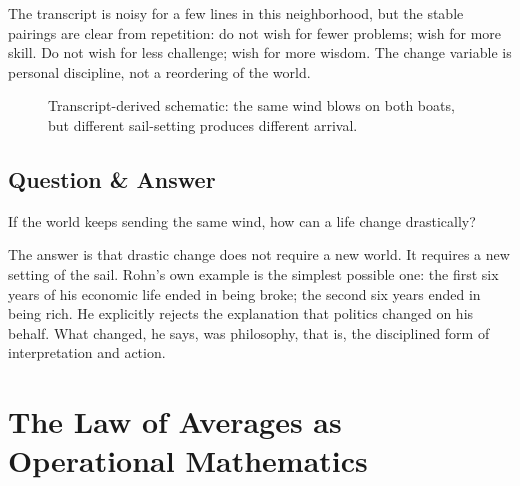 The transcript is noisy for a few lines in this neighborhood, but the stable pairings are clear from repetition: do not wish for fewer problems; wish for more skill. Do not wish for less challenge; wish for more wisdom. The change variable is personal discipline, not a reordering of the world.

\begin{figure}[h]
\centering
{}
\caption{Transcript-derived schematic: the same wind blows on both boats, but different sail-setting produces different arrival.}
\end{figure}

\subsection{Question \& Answer}

If the world keeps sending the same wind, how can a life change drastically?

The answer is that drastic change does not require a new world. It requires a new setting of the sail. Rohn's own example is the simplest possible one: the first six years of his economic life ended in being broke; the second six years ended in being rich. He explicitly rejects the explanation that politics changed on his behalf. What changed, he says, was philosophy, that is, the disciplined form of interpretation and action.

\section{The Law of Averages as Operational Mathematics}


